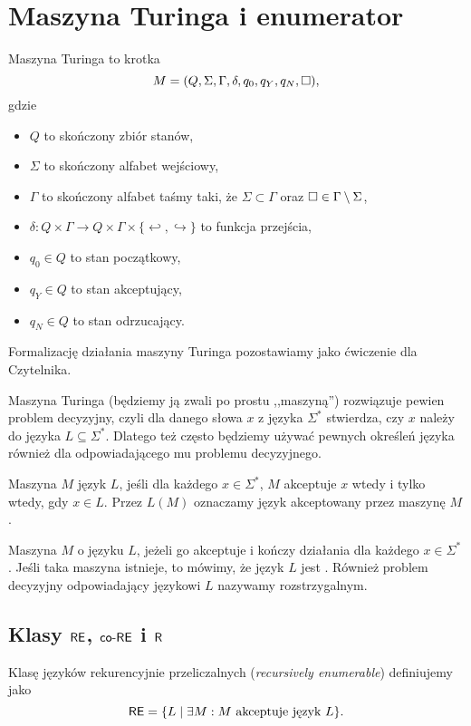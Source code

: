\section{Maszyna Turinga i enumerator}

\begin{definition}
    Maszyna Turinga to krotka
    \[ M = (Q, \Sigma, \Gamma, \delta, q_0, q_Y, q_N, \square),\]
    gdzie
    \begin{itemize}[noitemsep]
        \item $Q$ to skończony zbiór stanów,
        \item $\Sigma$ to skończony alfabet wejściowy,
        \item $\Gamma$ to skończony alfabet taśmy taki, że $\Sigma \subset \Gamma$ oraz $\square \in \Gamma \setminus \Sigma$,
        \item $\delta : Q \times \Gamma \to Q \times \Gamma \times \{\hookleftarrow , \hookrightarrow\}$ to funkcja przejścia,
        \item $q_0 \in Q$ to stan początkowy,
        \item $q_Y \in Q$ to stan akceptujący,
        \item $q_N \in Q$ to stan odrzucający.
    \end{itemize}
    Formalizację działania maszyny Turinga pozostawiamy jako ćwiczenie dla Czytelnika.
\end{definition}

Maszyna Turinga (będziemy ją zwali po prostu ,,maszyną'') rozwiązuje pewien problem decyzyjny, czyli dla danego słowa $x$ z języka $\Sigma^*$ stwierdza, czy $x$ należy do języka $L \subseteq \Sigma^*$. Dlatego też często będziemy używać pewnych określeń języka również dla odpowiadającego mu problemu decyzyjnego.

Maszyna $M$  język $L$, jeśli dla każdego $x \in \Sigma^*$, $M$ akceptuje $x$ wtedy i tylko wtedy, gdy $x \in L$. Przez $L(M)$ oznaczamy język akceptowany przez maszynę $M$.

Maszyna $M$  o języku $L$, jeżeli go akceptuje i kończy działania dla każdego $x \in \Sigma^*$. Jeśli taka maszyna istnieje, to mówimy, że język $L$ jest . Również problem decyzyjny odpowiadający językowi $L$ nazywamy rozstrzygalnym.

\subsection{Klasy $\textsf{RE}$, $\textsf{co-RE}$ i $\textsf{R}$}
\begin{definition}
    Klasę języków rekurencyjnie przeliczalnych (\textit{recursively enumerable}) definiujemy jako
    \[ \textsf{RE} = \{L \mid \exists M : M \text{ akceptuje język } L \}. \]
\end{definition}

